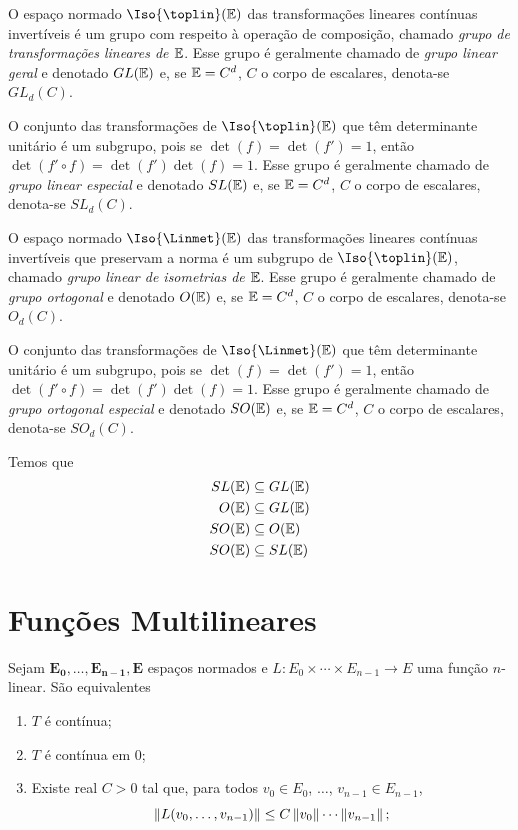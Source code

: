 O espaço normado $\Iso{\toplin}(\E)$ das transformações lineares contínuas invertíveis é um grupo com respeito à operação de composição, chamado \emph{grupo de transformações lineares de $\mathbb{E}$}. Esse grupo é geralmente chamado de \emph{grupo linear geral} e denotado $GL(\mathbb{E})$ e, se $\mathbb{E}=C^d$, $C$ o corpo de escalares, denota-se $GL_d(C)$.

O conjunto das transformações de $\Iso{\toplin}(\E)$ que têm determinante unitário é um subgrupo, pois se $\det(f)=\det(f')=1$, então $\det(f' \circ f)=\det(f')\det(f)=1$. Esse grupo é geralmente chamado de \emph{grupo linear especial} e denotado $SL(\mathbb{E})$ e, se $\mathbb{E}=C^d$, $C$ o corpo de escalares, denota-se $SL_d(C)$.

O espaço normado $\Iso{\Linmet}(\E)$ das transformações lineares contínuas invertíveis que preservam a norma é um subgrupo de $\Iso{\toplin}(\E)$, chamado \emph{grupo linear de isometrias de $\mathbb{E}$}. Esse grupo é geralmente chamado de \emph{grupo ortogonal} e denotado $O(\mathbb{E})$ e, se $\mathbb{E}=C^d$, $C$ o corpo de escalares, denota-se $O_d(C)$.

O conjunto das transformações de $\Iso{\Linmet}(\E)$ que têm determinante unitário é um subgrupo, pois se $\det(f)=\det(f')=1$, então $\det(f' \circ f)=\det(f')\det(f)=1$. Esse grupo é geralmente chamado de \emph{grupo ortogonal especial} e denotado $SO(\mathbb{E})$ e, se $\mathbb{E}=C^d$, $C$ o corpo de escalares, denota-se $SO_d(C)$.

Temos que
	\begin{align*}
	SL(\mathbb{E}) &\subseteq GL(\mathbb{E}) \\
	O(\mathbb{E}) &\subseteq GL(\mathbb{E}) \\
	SO(\mathbb{E}) &\subseteq O(\mathbb{E}) \\
	SO(\mathbb{E}) &\subseteq SL(\mathbb{E})
	\end{align*}

\section{Funções Multilineares}

\begin{prop}
Sejam $\bm{E_0},\dots,\bm{E_{n-1}},\bm{E}$ espaços normados e $L\colon E_0 \times \cdots \times E_{n-1} \to E$ uma função $n$-linear. São equivalentes
	\begin{enumerate}
	\item $T$ é contínua;
	\item $T$ é contínua em $0$;
	\item Existe real $C>0$ tal que, para todos $v_0 \in E_0$, $\ldots$, $v_{n-1} \in E_{n-1}$,
		\begin{equation*}
		\left\Vert{L(v_0,\dots,v_{n-1})}\right\Vert \leq C\left\Vert{v_0}\right\Vert\cdots\left\Vert{v_{n-1}}\right\Vert;
		\end{equation*}	
	\end{enumerate}
\end{prop}

